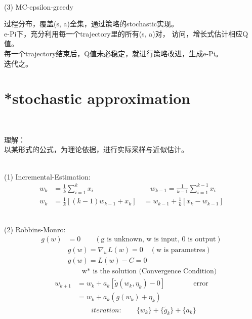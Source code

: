 \documentclass{article}
\begin{document}
~ \\[3pt]
(3) MC-epsilon-greedy 
~ \\[3pt]
\begin{CJK}{UTF8}{gbsn}
    过程分布，覆盖(s, a)全集，通过策略的stochastic实现。 \\[3pt]
    e-Pi下，充分利用每一个trajectory里的所有(s, a)对，
    访问，增长式估计相应Q值。 \\[3pt]
    每一个trajectory结束后，Q值未必稳定，就进行策略改进，生成e-Pi。 \\[3pt]
    迭代之。 \\[3pt]
\end{CJK}


\newpage
\section*{*stochastic approximation}


~ \\[3pt]
\begin{CJK}{UTF8}{gbsn}
    理解： \\[3pt]
    以某形式的公式，为理论依据，进行实际采样与近似估计。 \\[3pt]
\end{CJK}


~ \\[3pt]
(1) Incremental-Estimation: 
\begin{align*}
    w_{k}   &= \frac {1} {k} \sum_{i=1}^{k} x_{i} 
            \qquad \qquad \qquad \qquad 
    w_{k-1}  = \frac {1} {k-1} \sum_{i=1}^{k-1} x_{i} \\[3pt]
    w_{k}   &= \frac {1} {k} [ (k-1)w_{k-1} + x_{k} ] 
            \quad = w_{k-1} + \frac {1} {k} 
            [ x_{k} - w_{k-1} ] 
\end{align*}


~ \\[3pt]
(2) Robbins-Monro: 
\begin{align*}
    g(w) 
    & = 0 \qquad (\text{g is unknown, w is input, 0 is output}) \\[3pt]
    & g(w) = \nabla_{w} L(w) = 0 \quad (\text{w is parametres}) \\[3pt]
    & g(w) = L(w) - C = 0 \\[3pt]
    & \qquad \text{w* is the solution (Convergence Condition)} 
\end{align*}
\begin{align*}
    w_{k+1} &= w_{k} + a_{k} [ \tilde{g} ( w_{k}, \eta_{k} ) - 0 ] 
            \qquad \qquad \text{error} \\[3pt]
            &= w_{k} + a_{k} ( g(w_{k}) + \eta_{k} ) \\[3pt]
            & \qquad iteration: \qquad 
            \{w_{k}\} + \{\tilde{g}_{k}\} + \{a_{k}\} 
\end{align*}
\end{document}
